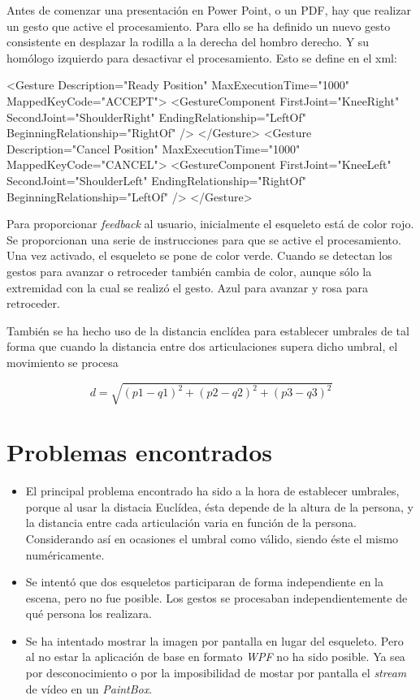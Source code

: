 \documentclass[	DIV=calc,%
							paper=a4,%
							fontsize=11pt]{scrartcl}	 					%
\begin{document}
Antes de comenzar una presentación en Power Point, o un PDF, hay que realizar un gesto que active el procesamiento. Para ello se ha definido un nuevo gesto consistente en desplazar la rodilla a la derecha del hombro derecho. Y su homólogo izquierdo para desactivar el procesamiento. Esto se define en el xml:
\begin{xmlcode}
	<Gesture Description="Ready Position" MaxExecutionTime="1000" MappedKeyCode="ACCEPT">
			<GestureComponent FirstJoint="KneeRight" SecondJoint="ShoulderRight" EndingRelationship="LeftOf" BeginningRelationship="RightOf" />
	</Gesture>
	<Gesture Description="Cancel Position" MaxExecutionTime="1000" MappedKeyCode="CANCEL">
			<GestureComponent FirstJoint="KneeLeft" SecondJoint="ShoulderLeft" EndingRelationship="RightOf" BeginningRelationship="LeftOf" />
	</Gesture>
\end{xmlcode}
Para proporcionar \textit{feedback} al usuario, inicialmente el esqueleto está de color rojo. Se proporcionan una serie de instrucciones para que se active el procesamiento. Una vez activado, el esqueleto se pone de color verde. Cuando se detectan los gestos para avanzar o retroceder también cambia de color, aunque sólo la extremidad con la cual se realizó el gesto. Azul para avanzar y rosa para retroceder. 

También se ha hecho uso de la distancia enclídea para establecer umbrales de tal forma que cuando la distancia entre dos articulaciones supera dicho umbral, el movimiento se procesa

\[
	d = \sqrt{(p1-q1)^2 + (p2-q2)^2 + (p3-q3)^2}
\]

\section{Problemas encontrados}

\begin{itemize}
	\item El principal problema encontrado ha sido a la hora de establecer umbrales, porque al usar la distacia Euclídea, ésta depende de la altura de la persona, y la distancia entre cada articulación varia en función de la persona. Considerando así en ocasiones el umbral como válido, siendo éste el mismo numéricamente.
	\item Se intentó que dos esqueletos participaran de forma independiente en la escena, pero no fue posible. Los gestos se procesaban independientemente de qué persona los realizara.
	\item Se ha intentado mostrar la imagen por pantalla en lugar del esqueleto. Pero al no estar la aplicación de base en formato \textit{WPF} no ha sido posible. Ya sea por desconocimiento o por la imposibilidad de mostar por pantalla el \textit{stream} de vídeo en un \textit{PaintBox}.
\end{itemize}



{}

\end{document}
